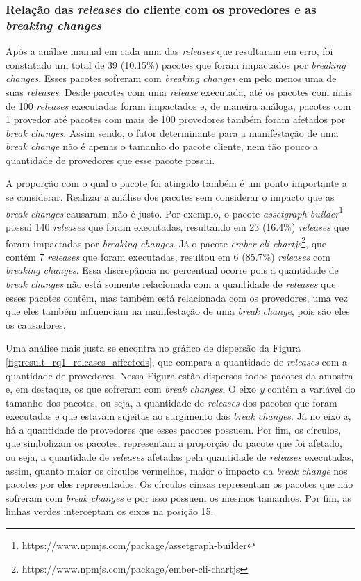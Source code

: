 \subsubsection{Relação das \textit{releases} do cliente com os provedores e as \textit{breaking changes}}

Após a análise manual em cada uma das \textit{releases} que resultaram em erro, foi constatado um total de 39 (10.15\%) pacotes que foram impactados por \textit{breaking changes}. Esses pacotes sofreram com \textit{breaking changes} em pelo menos uma de suas \textit{releases}. Desde pacotes com uma \textit{release} executada, até os pacotes com mais de 100 \textit{releases} executadas foram impactados e, de maneira análoga, pacotes com 1 provedor até pacotes com mais de 100 provedores também foram afetados por \textit{break changes}. Assim sendo, o fator determinante para a manifestação de uma \textit{break change} não é apenas o tamanho do pacote cliente, nem tão pouco a quantidade de provedores que esse pacote possui.

A proporção com o qual o pacote foi atingido também é um ponto importante a se considerar. Realizar a análise dos pacotes sem considerar o impacto que as \textit{break changes} causaram, não é justo. Por exemplo, o pacote \textit{assetgraph-builder}\footnote{https://www.npmjs.com/package/assetgraph-builder} possui 140 \textit{releases} que foram executadas, resultando em 23 (16.4\%) \textit{releases} que foram impactadas por \textit{breaking changes}. Já o pacote \textit{ember-cli-chartjs}\footnote{https://www.npmjs.com/package/ember-cli-chartjs}, que contém 7 \textit{releases} que foram executadas, resultou em 6 (85.7\%) \textit{releases} com \textit{breaking changes}. Essa discrepância no percentual ocorre pois a quantidade de \textit{break changes} não está somente relacionada com a quantidade de  \textit{releases} que esses pacotes contêm, mas também está relacionada com os provedores, uma vez que eles também influenciam na manifestação de uma \textit{break change}, pois são eles os causadores.

Uma análise mais justa se encontra no gráfico de dispersão da Figura \ref{fig:result_rq1_releases_affecteds}, que compara a quantidade de \textit{releases} com a quantidade de provedores. Nessa Figura estão dispersos todos pacotes da amostra e, em destaque, os que sofreram com \textit{break changes}. O eixo \textit{y} contém a variável do tamanho dos pacotes, ou seja, a quantidade de \textit{releases} dos pacotes que foram executadas e que estavam sujeitas ao surgimento das \textit{break changes}. Já no eixo \textit{x}, há a quantidade de provedores que esses pacotes possuem. Por fim, os  círculos, que simbolizam os pacotes, representam a proporção do pacote que foi afetado, ou seja, a quantidade de \textit{releases} afetadas pela quantidade de \textit{releases} executadas, assim, quanto maior os círculos vermelhos, maior o impacto da \textit{break change} nos pacotes por eles representados. Os círculos cinzas representam os pacotes que não sofreram com \textit{break changes} e por isso possuem os mesmos tamanhos. Por fim, as linhas verdes interceptam os eixos na posição 15.

